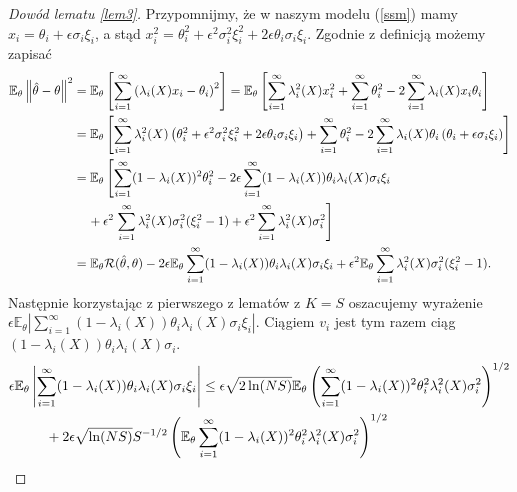 \documentclass[man,mfiu]{mgrwms}
\newcommand{\norm}[1]{\left\lVert#1\right\rVert}
\begin{document}
\begin{proof}[Dowód lematu \ref{lem3}]
Przypomnijmy, że w naszym modelu (\ref{ssm}) mamy $x_i=\theta_i+\epsilon\sigma_i\xi_i$, a stąd $x_i^2=\theta^2_i+\epsilon^2\sigma^2_i\xi_i^2+2\epsilon\theta_i\sigma_i\xi_i$. Zgodnie z definicją możemy zapisać
\begin{displaymath}
\begin{split}
\mathbb{E}_{\theta}\norm{\hat{\theta}-\theta}^2&=\mathbb{E}_{\theta}\left[\sum_{i=1}^{\infty}\left(\lambda_i(X)x_i-\theta_i\right)^2\right]=\mathbb{E}_{\theta}\left[\sum_{i=1}^{\infty}\lambda_i^2(X)x_i^2+\sum_{i=1}^{\infty}\theta_i^2-2\sum_{i=1}^{\infty}\lambda_i(X)x_i\theta_i\right]\\
&=\mathbb{E}_{\theta}\left[\sum_{i=1}^{\infty}\lambda_i^2(X)\left(\theta^2_i+\epsilon^2\sigma^2_i\xi_i^2+2\epsilon\theta_i\sigma_i\xi_i\right)+\sum_{i=1}^{\infty}\theta_i^2-2\sum_{i=1}^{\infty}\lambda_i(X)\theta_i\left(\theta_i+\epsilon\sigma_i\xi_i\right)\right]\\
&=\mathbb{E}_{\theta}\left[\sum_{i=1}^{\infty}(1-\lambda_i(X))^2\theta_i^2-2\epsilon\sum_{i=1}^{\infty}(1-\lambda_i(X))\theta_i\lambda_i(X)\sigma_i\xi_i\right.\\
&\hspace{4mm}+\epsilon^2\left.\sum_{i=1}^{\infty}\lambda_i^2(X)\sigma_i^2(\xi^2_i-1)+\epsilon^2\sum_{i=1}^{\infty}\lambda_i^2(X)\sigma_i^2\right]\\
&=\mathbb{E}_{\theta}\mathcal{R}(\hat{\theta},\theta)-2\epsilon\mathbb{E}_{\theta}\sum_{i=1}^{\infty}(1-\lambda_i(X))\theta_i\lambda_i(X)\sigma_i\xi_i+\epsilon^2\mathbb{E}_{\theta}\sum_{i=1}^{\infty}\lambda_i^2(X)\sigma_i^2(\xi^2_i-1).
\end{split}
\end{displaymath}
Następnie korzystając z pierwszego z lematów z $K=S$ oszacujemy wyrażenie \\$\epsilon\mathbb{E}_{\theta}\left|\sum_{i=1}^{\infty}(1-\lambda_i(X))\theta_i\lambda_i(X)\sigma_i\xi_i\right|$. Ciągiem $v_i$ jest tym razem ciąg $(1-\lambda_i(X))\theta_i\lambda_i(X)\sigma_i$.
\begin{displaymath}
\begin{split}
\epsilon\mathbb{E}_{\theta}&\left|\sum_{i=1}^{\infty}(1-\lambda_i(X))\theta_i\lambda_i(X)\sigma_i\xi_i\right|\leq
\epsilon\sqrt{2\ln (NS)}\mathbb{E}_{\theta}\left(\sum_{i=1}^{\infty}(1-\lambda_i(X))^2\theta_i^2\lambda_i^2(X)\sigma_i^2\right)^{1/2}\\
&\hspace{4mm}+2\epsilon\sqrt{\ln (NS)}S^{-1/2}\left(\mathbb{E}_{\theta}\sum_{i=1}^{\infty}(1-\lambda_i(X))^2\theta_i^2\lambda_i^2(X)\sigma_i^2\right)^{1/2}\\

\end{split}
\end{displaymath}
\end{proof}
\end{document}
